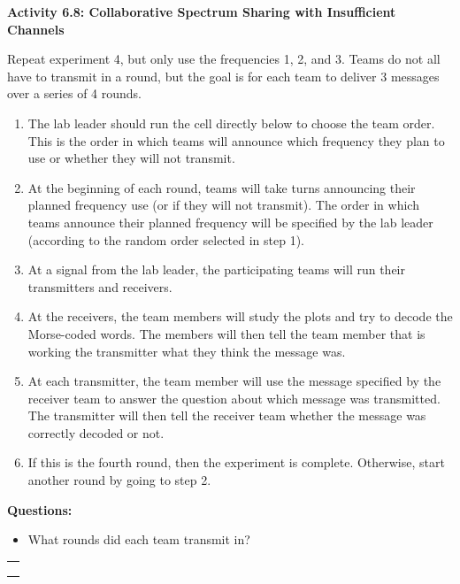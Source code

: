 \documentclass[11pt]{article}
\providecommand{\tightlist}{%
      \setlength{\itemsep}{0pt}\setlength{\parskip}{0pt}}
\begin{document}
    \textbf{Activity 6.8: Collaborative Spectrum Sharing with Insufficient
Channels}

Repeat experiment 4, but only use the frequencies 1, 2, and 3. Teams do
not all have to transmit in a round, but the goal is for each team to
deliver 3 messages over a series of 4 rounds.

\begin{enumerate}
\def\labelenumi{\arabic{enumi}.}
\tightlist
\item
  The lab leader should run the cell directly below to choose the team
  order. This is the order in which teams will announce which frequency
  they plan to use or whether they will not transmit.
\item
  At the beginning of each round, teams will take turns announcing their
  planned frequency use (or if they will not transmit). The order in
  which teams announce their planned frequency will be specified by the
  lab leader (according to the random order selected in step 1).
\item
  At a signal from the lab leader, the participating teams will run
  their transmitters and receivers.
\item
  At the receivers, the team members will study the plots and try to
  decode the Morse-coded words. The members will then tell the team
  member that is working the transmitter what they think the message
  was.
\item
  At each transmitter, the team member will use the message specified by
  the receiver team to answer the question about which message was
  transmitted. The transmitter will then tell the receiver team whether
  the message was correctly decoded or not.
\item
  If this is the fourth round, then the experiment is complete.
  Otherwise, start another round by going to step 2.
\end{enumerate}

\textbf{Questions:}

\begin{itemize}
\tightlist
\item
  What rounds did each team transmit in?
\end{itemize}

\begin{longtable}[]{@{}l@{}}
\toprule
 \\
\midrule
\endhead
 \\
 \\
 \\
\bottomrule
\end{longtable}
\end{document}
